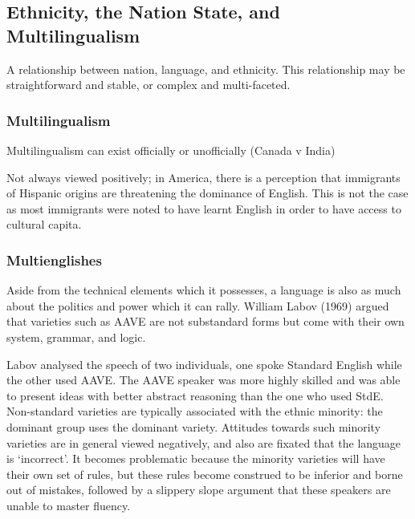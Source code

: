\documentclass[../main.tex]{subfiles}
\begin{document}
    \subsection{Ethnicity, the Nation State, and Multilingualism}
    A relationship between nation, language, and ethnicity. This relationship may be straightforward and stable, or complex and multi-faceted.
    
    \subsubsection{Multilingualism}
    Multilingualism can exist officially or unofficially (Canada v India) \par
    Not always viewed positively; in America, there is a perception that immigrants of Hispanic origins are threatening the dominance of English. This is not the case as most immigrants were noted to have learnt English in order to have access to cultural capita. \par
    
    \subsubsection{Multienglishes}
    Aside from the technical elements which it possesses, a language is also as much about the politics and power which it can rally. William Labov (1969) argued that varieties such as AAVE are not substandard forms but come with their own system, grammar, and logic. \par
    Labov analysed the speech of two individuals, one spoke Standard English while the other used AAVE. The AAVE speaker was more highly skilled and was able to present ideas with better abstract reasoning than the one who used StdE. Non-standard varieties are typically associated with the ethnic minority: the dominant group uses the dominant variety. Attitudes towards such minority varieties are in general viewed negatively, and also are fixated that the language is `incorrect'. It becomes problematic because the minority varieties will have their own set of rules, but these rules become construed to be inferior and borne out of mistakes, followed by a slippery slope argument that these speakers are unable to master fluency.
\end{document}
